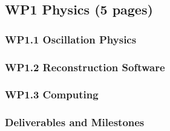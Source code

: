 \subsection{WP1 Physics (5 pages)}
\subsubsection{WP1.1 Oscillation Physics}
\subsubsection{WP1.2 Reconstruction Software}
\subsubsection{WP1.3 Computing}

\subsubsection{Deliverables and Milestones}
